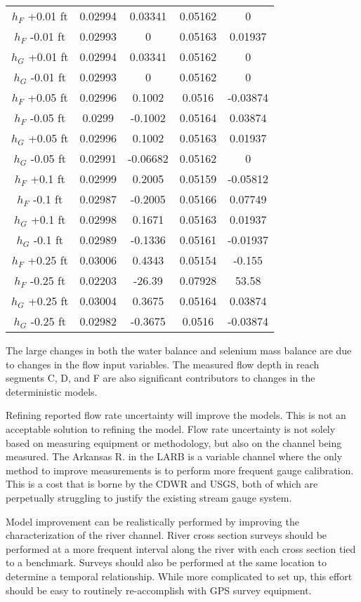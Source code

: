 \begin{linenumbers}
\begin{spacing}{1.0}
\begin{center}
\begin{longtable}{c|cc|cc}
	$h_{F}$ +0.01 ft&					0.02994&	0.03341&	0.05162&	0\\       
	$h_{F}$ -0.01 ft&					0.02993&	0&	0.05163&	0.01937\\         
	$h_{G}$ +0.01 ft&					0.02994&	0.03341&	0.05162&	0\\       
	$h_{G}$ -0.01 ft&					0.02993&	0&	0.05162&	0\\               
	$h_{F}$ +0.05 ft&					0.02996&	0.1002&	0.0516&	-0.03874\\        
	$h_{F}$ -0.05 ft&					0.0299&	-0.1002&	0.05164&	0.03874\\     
	$h_{G}$ +0.05 ft&					0.02996&	0.1002&	0.05163&	0.01937\\     
	$h_{G}$ -0.05 ft&					0.02991&	-0.06682&	0.05162&	0\\       
	$h_{F}$ +0.1 ft	&					0.02999&	0.2005&	0.05159&	-0.05812\\    
	$h_{F}$ -0.1 ft	&					0.02987&	-0.2005&	0.05166&	0.07749\\ 
	$h_{G}$ +0.1 ft	&					0.02998&	0.1671&	0.05163&	0.01937\\     
	$h_{G}$ -0.1 ft	&					0.02989&	-0.1336&	0.05161&	-0.01937\\
	$h_{F}$ +0.25 ft&					0.03006&	0.4343&	0.05154&	-0.155\\      
	$h_{F}$ -0.25 ft&					0.02203&	-26.39&	0.07928&	53.58\\       
	$h_{G}$ +0.25 ft&					0.03004&	0.3675&	0.05164&	0.03874\\     
	$h_{G}$ -0.25 ft&					0.02982&	-0.3675&	0.0516&	-0.03874\\    
    \hline
\end{longtable}%
\end{center}
\end{spacing}

The large changes in both the water balance and selenium mass balance are due to changes in the flow input variables.  The measured flow depth in reach segments C, D, and F are also significant contributors to changes in the deterministic models.  

Refining reported flow rate uncertainty will improve the models.  This is not an acceptable solution to refining the model.  Flow rate uncertainty is not solely based on measuring equipment or methodology, but also on the channel being measured.  The Arkansas R. in the LARB is a variable channel where the only method to improve measurements is to perform more frequent gauge calibration.  This is a cost that is borne by the CDWR and USGS, both of which are perpetually struggling to justify the existing stream gauge system.

Model improvement can be realistically performed by improving the characterization of the river channel.  River cross section surveys should be performed at a more frequent interval along the river with each cross section tied to a benchmark.  Surveys should also be performed at the same location to determine a temporal relationship.  While more complicated to set up, this effort should be easy to routinely re-accomplish with GPS survey equipment.

\clearpage{}
\end{linenumbers}